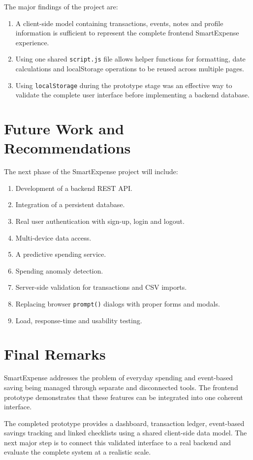 \documentclass[12pt,a4paper]{report}
\begin{document}
The major findings of the project are:

\begin{enumerate}
    \item A client-side model containing transactions, events, notes and
    profile information is sufficient to represent the complete frontend
    SmartExpense experience.

    \item Using one shared \texttt{script.js} file allows helper functions
    for formatting, date calculations and localStorage operations to be
    reused across multiple pages.

    \item Using \texttt{localStorage} during the prototype stage was an
    effective way to validate the complete user interface before implementing
    a backend database.
\end{enumerate}


\section{Future Work and Recommendations}

The next phase of the SmartExpense project will include:

\begin{enumerate}
    \item Development of a backend REST API.
    \item Integration of a persistent database.
    \item Real user authentication with sign-up, login and logout.
    \item Multi-device data access.
    \item A predictive spending service.
    \item Spending anomaly detection.
    \item Server-side validation for transactions and CSV imports.
    \item Replacing browser \texttt{prompt()} dialogs with proper forms
    and modals.
    \item Load, response-time and usability testing.
\end{enumerate}


\section{Final Remarks}

SmartExpense addresses the problem of everyday spending and event-based
saving being managed through separate and disconnected tools. The frontend
prototype demonstrates that these features can be integrated into one
coherent interface.

The completed prototype provides a dashboard, transaction ledger,
event-based savings tracking and linked checklists using a shared
client-side data model. The next major step is to connect this validated
interface to a real backend and evaluate the complete system at a realistic
scale.

\end{document}
